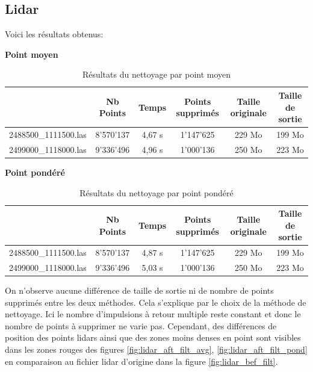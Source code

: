 \subsection{Lidar}
Voici les résultats obtenus:

\textbf{Point moyen}

\begin{table}[htb!]
\begin{tabular}{l|c|c|c|c|c|}
\cline{2-6}
\multicolumn{1}{c|}{}                      & Nb Points & Temps  & Points supprimés & Taille originale & Taille de sortie \\ \hline
\multicolumn{1}{|l|}{2488500\_1111500.las} & 8'570'137 & 4,67 s & 1'147'625        & 229 Mo          & 199 Mo           \\ \hline
\multicolumn{1}{|l|}{2499000\_1118000.las} & 9'336'496 & 4,96 s & 1'000'136        & 250 Mo          & 223 Mo           \\ \hline
\end{tabular}
\caption{Résultats du nettoyage par point moyen}
\label{tab:las_cleaning_avg}
\end{table}

\textbf{Point pondéré}

\begin{table}[htb!]
\begin{tabular}{l|c|c|c|c|c|}
\cline{2-6}
\multicolumn{1}{c|}{}                      & Nb Points & Temps  & Points supprimés & Taille originale & Taille de sortie \\ \hline
\multicolumn{1}{|l|}{2488500\_1111500.las} & 8'570'137 & 4,87 s & 1'147'625        & 229 Mo          & 199 Mo           \\ \hline
\multicolumn{1}{|l|}{2499000\_1118000.las} & 9'336'496 & 5,03 s & 1'000'136        & 250 Mo          & 223 Mo           \\ \hline
\end{tabular}
\caption{Résultats du nettoyage par point pondéré}
\label{tab:las_cleaning_ponderated}
\end{table}

On n’observe aucune différence de taille de sortie ni de nombre de points supprimés entre les deux méthodes.
Cela s'explique par le choix de la méthode de nettoyage.
Ici le nombre d'impulsions à retour multiple reste constant et donc le nombre de points à supprimer ne varie pas.
\newpage
Cependant, des différences de position des points lidars ainsi que des zones moins denses en point
sont visibles dans les zones rouges des figures \ref{fig:lidar_aft_filt_avg}, \ref{fig:lidar_aft_filt_pond} en
comparaison au fichier lidar d'origine dans la figure \ref{fig:lidar_bef_filt}.

